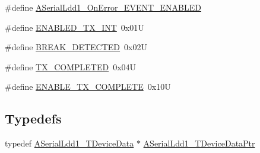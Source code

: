 \begin{DoxyCompactItemize}
\item 
\#define \hyperlink{group___a_serial_ldd1__module_gab39b2ceda501dc0190b56ef407291fc5}{A\-Serial\-Ldd1\-\_\-\-On\-Error\-\_\-\-E\-V\-E\-N\-T\-\_\-\-E\-N\-A\-B\-L\-E\-D}
\item 
\#define \hyperlink{group___a_serial_ldd1__module_gab05896dbf11eed7f4078978e7287669d}{E\-N\-A\-B\-L\-E\-D\-\_\-\-T\-X\-\_\-\-I\-N\-T}~0x01\-U
\item 
\#define \hyperlink{group___a_serial_ldd1__module_ga617e6f524bf659f58012c8f0248004e5}{B\-R\-E\-A\-K\-\_\-\-D\-E\-T\-E\-C\-T\-E\-D}~0x02\-U
\item 
\#define \hyperlink{group___a_serial_ldd1__module_ga1f79d891cf81d9f65cccd3a0ab84b1ee}{T\-X\-\_\-\-C\-O\-M\-P\-L\-E\-T\-E\-D}~0x04\-U
\item 
\#define \hyperlink{group___a_serial_ldd1__module_gac0fc7ebba74ca47c17389980225ddf48}{E\-N\-A\-B\-L\-E\-\_\-\-T\-X\-\_\-\-C\-O\-M\-P\-L\-E\-T\-E}~0x10\-U
\end{DoxyCompactItemize}
\subsection*{Typedefs}
\begin{DoxyCompactItemize}
\item 
typedef \hyperlink{struct_a_serial_ldd1___t_device_data}{A\-Serial\-Ldd1\-\_\-\-T\-Device\-Data} $\ast$ \hyperlink{group___a_serial_ldd1__module_ga3d5a6f8c983c88c4447d8c30465a7d12}{A\-Serial\-Ldd1\-\_\-\-T\-Device\-Data\-Ptr}
\end{DoxyCompactItemize}
